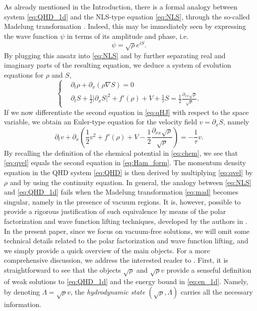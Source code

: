 \documentclass[leqno]{amsart}
\theoremstyle{plain}
\theoremstyle{definition}
\theoremstyle{remark}
\theoremstyle{plain}
\theoremstyle{plain}
\def\d{{\partial}}
\numberwithin{equation}{section}
\begin{document}
As already mentioned in the Introduction, there is a formal analogy between system \eqref{eq:QHD_1d} and the NLS-type equation \eqref{eq:NLS}, through the so-called Madelung transformation \cite{Mad}. Indeed, this may be immediately seen by expressing the wave function $\psi$ in terms of its amplitude and phase, i.e.
\begin{equation}\label{eq:mad}
\psi=\sqrt{\rho}e^{iS}.
\end{equation}
By plugging this ansatz into \eqref{eq:NLS} and by further separating real and imaginary parts of the resulting equation, we deduce a system of evolution equations for $\rho$ and $S$, 
\begin{equation}\label{eq:qHJ}
\left\{\begin{aligned}
&\d_t\rho+\d_x(\rho\nabla S)=0\\
&\d_tS+\frac12|\d_x S|^2+f'(\rho)+V+\frac1\tau S=\frac12\frac{\d_{xx}\sqrt{\rho}}{\sqrt{\rho}}.
\end{aligned}\right.
\end{equation}
If we now differentiate the second equation in \eqref{eq:qHJ} with respect to the space variable, we obtain an Euler-type equation for the velocity field $v=\d_xS$, namely
\begin{equation}\label{eq:qvel}
\d_tv+\d_x\left(\frac12v^2+f'(\rho)+V-\frac12\frac{\d_{xx}\sqrt{\rho}}{\sqrt{\rho}}\right)=-\frac1\tau v.
\end{equation}
By recalling the definition of the chemical potential in \eqref{eq:chem}, we see that \eqref{eq:qvel} equals the second equation in \eqref{eq:Ham_form}.
The momentum density equation in the QHD system \eqref{eq:QHD} is then derived by multiplying \eqref{eq:qvel} by $\rho$ and by using the continuity equation.
\newline
In general, the analogy between \eqref{eq:NLS} and \eqref{eq:QHD_1d} fails when the Madelung transformation \eqref{eq:mad} becomes singular, namely in the presence of vacuum regions. It is, however, possible to provide a rigorous justification of such equivalence by means of the polar factorization and wave function lifting techniques, developed by the authors in \cite{AM1, AM2, AMZ1}. In the present paper, since we focus on vacuum-free solutions, we will omit some technical details related to the polar factorization and wave function lifting, and we simply provide a quick overview of the main objects. For a more comprehensive discussion, we address the interested reader to \cite{AM_b, HaoMinE}.
\newline
First,
it is straightforward to see that the objects $\sqrt{\rho}$ and $\sqrt{\rho}v$ provide a senseful definition of weak solutions to \eqref{eq:QHD_1d} and the energy bound in \eqref{eq:en_1d}. Namely, by denoting $\Lambda=\sqrt{\rho}v$, the \emph{hydrodynamic state} $(\sqrt{\rho}, \Lambda)$ carries all the necessary information.
\end{document}
